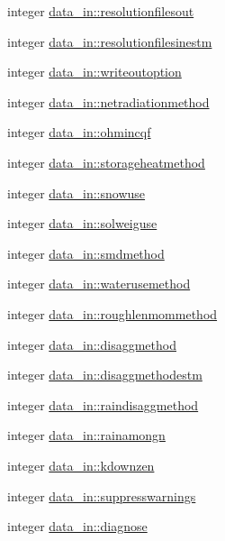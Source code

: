 \begin{DoxyCompactItemize}
integer \hyperlink{namespacedata__in_a6ea370f15cdb7fab545340173792072a}{data\+\_\+in\+::resolutionfilesout}
\item 
integer \hyperlink{namespacedata__in_a1babc329d678c128938354d4c21505b9}{data\+\_\+in\+::resolutionfilesinestm}
\item 
integer \hyperlink{namespacedata__in_a902aee6a424a884da4775e7a40782896}{data\+\_\+in\+::writeoutoption}
\item 
integer \hyperlink{namespacedata__in_a0b433ad2361360f657c537b128e4a5f7}{data\+\_\+in\+::netradiationmethod}
\item 
integer \hyperlink{namespacedata__in_a27bd8e1db530bad815c128979003c184}{data\+\_\+in\+::ohmincqf}
\item 
integer \hyperlink{namespacedata__in_aba572e9ad5577e14bcd393849b1fcdf3}{data\+\_\+in\+::storageheatmethod}
\item 
integer \hyperlink{namespacedata__in_a43b72c0ea9c40a969cac5f758c240815}{data\+\_\+in\+::snowuse}
\item 
integer \hyperlink{namespacedata__in_a6cc0dbee756c4ddc20f395bd37f7ad8f}{data\+\_\+in\+::solweiguse}
\item 
integer \hyperlink{namespacedata__in_a306f10a44e3e8097152fc6a9c0403f6b}{data\+\_\+in\+::smdmethod}
\item 
integer \hyperlink{namespacedata__in_ab3b82014d0bd4e04ce70642a274dd0dc}{data\+\_\+in\+::waterusemethod}
\item 
integer \hyperlink{namespacedata__in_ae0baee62dbc6ad6a70c51f5eb1c1882b}{data\+\_\+in\+::roughlenmommethod}
\item 
integer \hyperlink{namespacedata__in_acdfe353290d799264bab6281a87a1fa7}{data\+\_\+in\+::disaggmethod}
\item 
integer \hyperlink{namespacedata__in_a672fba472da09ab270c02ec3e92ff9a3}{data\+\_\+in\+::disaggmethodestm}
\item 
integer \hyperlink{namespacedata__in_ae443b92cf02ecc9331aa9f83b2101f90}{data\+\_\+in\+::raindisaggmethod}
\item 
integer \hyperlink{namespacedata__in_ac8669fa345dd942fb34ee438634579a4}{data\+\_\+in\+::rainamongn}
\item 
integer \hyperlink{namespacedata__in_ad7a96eb31a956b650073fc7135d307cd}{data\+\_\+in\+::kdownzen}
\item 
integer \hyperlink{namespacedata__in_a70af1f33c9424336cb42b8c11bfdf51f}{data\+\_\+in\+::suppresswarnings}
\item 
integer \hyperlink{namespacedata__in_aa277445969a4533d0db8452d45164762}{data\+\_\+in\+::diagnose}

\end{DoxyCompactItemize}
